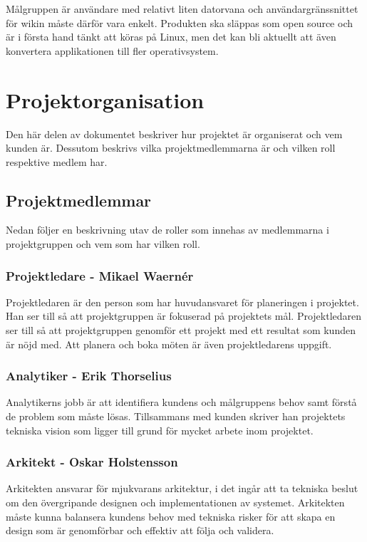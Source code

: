 Målgruppen är användare med relativt liten datorvana och användargränssnittet för wikin måste därför vara enkelt. Produkten ska släppas som open source och är i första hand tänkt att köras på Linux, men det kan bli aktuellt att även konvertera applikationen till fler operativsystem.

\section{Projektorganisation}
Den här delen av dokumentet beskriver hur projektet är organiserat och vem kunden är. Dessutom beskrivs vilka projektmedlemmarna är och vilken roll respektive medlem har.

\subsection{Projektmedlemmar}
Nedan följer en beskrivning utav de roller som innehas av medlemmarna i projektgruppen och vem som har vilken roll.

\subsubsection*{Projektledare - Mikael Waernér}
Projektledaren är den person som har huvudansvaret för planeringen i projektet. Han ser till så att projektgruppen är fokuserad på projektets mål. Projektledaren ser till så att projektgruppen genomför ett projekt med ett resultat som kunden är nöjd med. Att planera och boka möten är även projektledarens uppgift.

\subsubsection*{Analytiker - Erik Thorselius}
Analytikerns jobb är att identifiera kundens och målgruppens behov samt förstå de problem som måste lösas. Tillsammans med kunden skriver han projektets tekniska vision som ligger till grund för mycket arbete inom projektet.

\subsubsection*{Arkitekt - Oskar Holstensson}
Arkitekten ansvarar för mjukvarans arkitektur, i det ingår att ta tekniska beslut om den övergripande designen och implementationen av systemet. Arkitekten måste kunna balansera kundens behov med tekniska risker för att skapa en design som är genomförbar och effektiv att följa och validera.

